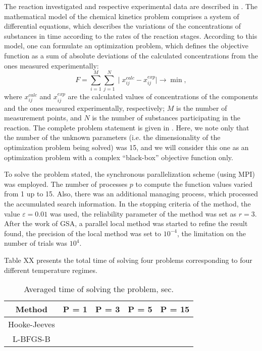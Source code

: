 \documentclass[runningheads]{llncs}
\begin{document}
The reaction investigated and respective experimental data are described in \cite{Uskov2020}. The mathematical model of the chemical kinetics problem comprises a system of differential equations, which describes the variations of the concentrations of substances in time according to the rates of the reaction stages. According to this model, one can formulate an optimization problem, which defines the objective function as a sum of absolute deviations of the calculated concentrations from the ones measured experimentally:
\[
F = \sum_{i=1}^{M} \sum_{j=1}^{N} \mid x_{ij}^{calc} - x_{ij}^{exp}\mid \rightarrow \min,
\]
where $x_{ij}^{calc}$ and $x_{ij}^{exp}$ are the calculated values of concentrations of the components and the ones measured experimentally, respectively; $M$ is the number of measurement points, and $N$ is the number of substances participating in the reaction. The complete problem statement is given in \cite{PAVT}. Here, we note only that the number of the unknown parameters (i.e. the dimensionality of the optimization problem being solved) was 15, and we will consider this one as an optimization problem with a complex ``black-box'' objective function only.

To solve the problem stated, the synchronous parallelization scheme (using MPI) was employed. The number of processes $p$ to compute the function values varied from 1 up to 15. Also, there was an additional managing process, which processed the accumulated search information. In the stopping criteria of the method, the value $\varepsilon=0.01$ was used, the reliability parameter of the method was set as $r = 3$. After the work of GSA, a parallel local method was started to refine the result found, the precision of the local method was set to $10^{-4}$, the limitation on the number of trials was $10^4$. 

Table XX presents the total time of solving four problems corresponding to four different temperature regimes.
\begin{table}[ht]
	\caption{Averaged time of solving the problem, sec.}
	\label{tab:11}
	\center
		\begin{tabular}{|c|c|c|c|c|}
		\hline
		Method & P = 1 & P = 3 & P = 5 & P = 15 \\
		\hline 
		Hooke-Jeeves &  &  &  &   \\
		\hline
		L-BFGS-B &  &  &  &   \\
		\hline
	\end{tabular}
\end{table}
\end{document}
